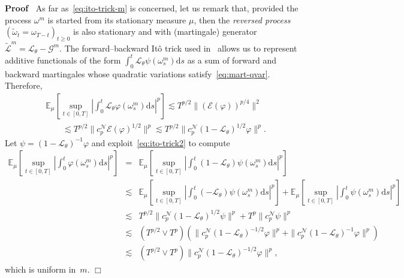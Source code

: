 \documentclass[10pt]{article}
\newcommand{\mathd}{\mathrm{d}}
\newcommand{\tmtextit}[1]{{\itshape{#1}}}
\newenvironment{proof}{\noindent\textbf{Proof\ }}{\hspace*{\fill}$\Box$\medskip}
\begin{document}
\begin{proof}
  As far as~{\eqref{eq:ito-trick-m}} is concerned, let us remark that,
  provided the process $\omega^m$ is started from its stationary measure
  $\mu$, then the \tmtextit{reversed process} $(\tilde{\omega}_t = \omega_{T -
  t})_{t \geqslant 0}$ is also stationary and with (martingale) generator
  $\tilde{\mathcal{L}}^m =\mathcal{L}_{\theta} -\mathcal{G}^m$. The
  forward--backward It{\^o} trick used in~{\cite{gubinelli2013regularization}}
  allows us to represent additive functionals of the form $\int_0^t
  \mathcal{L}_{\theta} \psi (\omega_s^m) \mathd s$ as a sum of forward and
  backward martingales whose quadratic variations
  satisfy~{\eqref{eq:mart-qvar}}. Therefore,
  \begin{equation}
    \begin{array}{l}
      \mathbb{E}_{\mu} \left[ \sup_{t \in [0, T]} \left| \int_0^t
      \mathcal{L}_{\theta} \varphi (\omega_s^m) \mathd s \right|^p \right]
      \lesssim T^{p / 2} \| (\mathcal{E} (\varphi))^{p / 4} \|^2\\
      \qquad \lesssim T^{p / 2} \| c_p^{\mathcal{N}} \mathcal{E} (\varphi)^{1
      / 2} \|^p \lesssim T^{p / 2} \| c_p^{\mathcal{N}} (1
      -\mathcal{L}_{\theta})^{1 / 2} \varphi \|^p .
    \end{array} \label{eq:ito-trick2}
  \end{equation}
  Let $\psi = (1 -\mathcal{L}_{\theta})^{- 1} \varphi$ and
  exploit~{\eqref{eq:ito-trick2}} to compute
  \[ \begin{array}{lll}
       \mathbb{E}_{\mu} \left[ \sup_{t \in [0, T]} \left| \int_0^t \varphi
       (\omega_s^m) \mathd s \right|^p \right] & = & \mathbb{E}_{\mu} \left[
       \sup_{t \in [0, T]} \left| \int_0^t (1 -\mathcal{L}_{\theta}) \psi
       (\omega_s^m) \mathd s \right|^p \right]\\
       & \lesssim & \mathbb{E}_{\mu} \left[ \sup_{t \in [0, T]} \left|
       \int_0^t (-\mathcal{L}_{\theta}) \psi (\omega_s^m) \mathd s \right|^p
       \right] +\mathbb{E}_{\mu} \left[ \sup_{t \in [0, T]} \left| \int_0^t
       \psi (\omega_s^m) \mathd s \right|^p \right]\\
       & \lesssim & T^{p / 2} \| c_p^{\mathcal{N}} (1
       -\mathcal{L}_{\theta})^{1 / 2} \psi \|^p + T^p \| c_p^{\mathcal{N}}
       \psi \|^p\\
       & \lesssim & (T^{p / 2} \vee T^p) (\| c_p^{\mathcal{N}} (1
       -\mathcal{L}_{\theta})^{- 1 / 2} \varphi \|^p + \| c_p^{\mathcal{N}} (1
       -\mathcal{L}_{\theta})^{- 1} \varphi \|^p)\\
       & \lesssim & (T^{p / 2} \vee T^p) \| c_p^{\mathcal{N}} (1
       -\mathcal{L}_{\theta})^{- 1 / 2} \varphi \|^p,
     \end{array} \]
  which is uniform in~$m$.
\end{proof}
\end{document}
